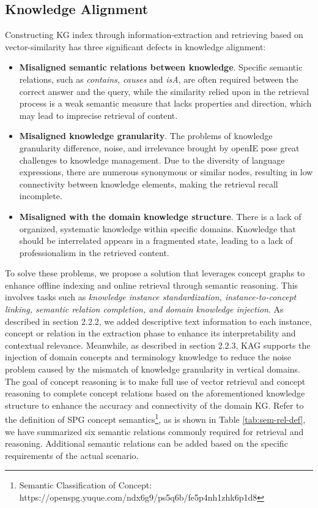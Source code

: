 \documentclass{article}
\begin{document}
\subsection{Knowledge Alignment}
Constructing KG index through information-extraction and retrieving based on vector-similarity has three significant defects in knowledge alignment:
\begin{itemize}
    \item \textbf{Misaligned semantic relations between knowledge}. Specific semantic relations, such as \textit{contains, causes} and \textit{isA}, are often required between the correct answer and the query, while the similarity relied upon in the retrieval process is a weak semantic measure that lacks properties and direction, which may lead to imprecise retrieval of content.
    \item \textbf{Misaligned knowledge granularity}. The problems of knowledge granularity difference, noise, and irrelevance brought by openIE pose great challenges to knowledge management. Due to the diversity of language expressions, there are numerous synonymous or similar nodes, resulting in low connectivity between knowledge elements, making the retrieval recall incomplete.
    \item \textbf{Misaligned with the domain knowledge structure}. There is a lack of organized, systematic knowledge within specific domains. Knowledge that should be interrelated appears in a fragmented state, leading to a lack of professionalism in the retrieved content.
\end{itemize}
To solve these problems, we propose a solution that leverages concept graphs to enhance offline indexing and online retrieval through semantic reasoning. This involves tasks such as \textit{knowledge instance standardization, instance-to-concept linking, semantic relation completion, and domain knowledge injection}. As described in section 2.2.2, we added descriptive text information to each instance, concept or relation in the extraction phase to enhance its interpretability and contextual relevance. Meanwhile, as described in section 2.2.3, KAG supports the injection of domain concepts and terminology knowledge to reduce the noise problem caused by the mismatch of knowledge granularity in vertical domains. The goal of concept reasoning is to make full use of vector retrieval and concept reasoning to complete concept relations based on the aforementioned knowledge structure to enhance the accuracy and connectivity of the domain KG. Refer to the definition of SPG concept semantics\footnote{Semantic Classification of Concept: https://openspg.yuque.com/ndx6g9/ps5q6b/fe5p4nh1zhk6p1d8}, as is shown in Table \ref{tab:sem-rel-def}, we have summarized six semantic relations commonly required for retrieval and reasoning. Additional semantic relations can be added based on the specific requirements of the actual scenario. 
\end{document}
